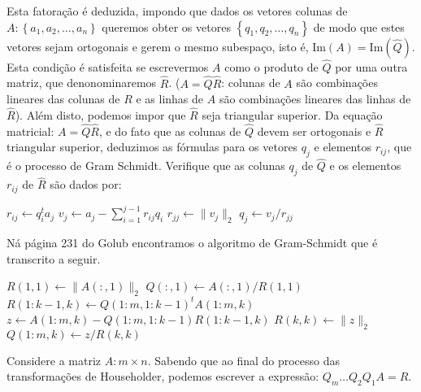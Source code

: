 \documentclass[a4paper,12pt, leqno, answers]{exam}
\begin{document}
\begin{questions}
    Esta fatora\c{c}\~{a}o \'{e} deduzida, impondo que dados os vetores colunas de $A : \left\{ a_1, a_2, \ldots, a_n \right\}$ queremos obter os vetores $\left\{ q_1, q_2, \ldots, q_n \right\}$ de modo que estes vetores sejam ortogonais e gerem o mesmo subespa\c{c}o, isto \'{e}, $\text{Im}(A) = \text{Im}(\hat{Q})$. Esta condi\c{c}\~{a}o \'{e} satisfeita se escrevermos $A$ como o produto de $\hat{Q}$ por uma outra matriz, que denonominaremos $\hat{R}$. ($A = \hat{Q} \hat{R}$: colunas de $A$ s\~{a}o combina\c{c}\~{o}es lineares das colunas de $R$ e as linhas de $A$ s\~{a}o combina\c{c}\~{o}es lineares das linhas de $\hat{R}$). Al\'{e}m disto, podemos impor que $\hat{R}$ seja triangular superior. Da equa\c{c}\~{a}o matricial: $A = \hat{Q} \hat{R}$, e do fato que as colunas de $\hat{Q}$ devem ser ortogonais e $\hat{R}$ triangular superior, deduzimos as f\'{o}rmulas para os vetores $q_j$ e elementos $r_{ij}$, que \'{e} o processo de Gram Schmidt. Verifique que as colunas $q_j$ de $\hat{Q}$ e os elementos $r_{ij}$ de $\hat{R}$ s\~{a}o dados por:
    \begin{algorithmic}
                \State $r_{ij} \leftarrow q_i^t a_j$
            \EndFor
            \State $v_j \leftarrow a_j - \sum_{i = 1}^{j - 1} r_{ij} q_i$
            \State $r_{jj} \leftarrow \| v_j \|_2$
            \State $q_j \leftarrow v_j / r_{jj}$
        \EndFor
    \end{algorithmic}
    \begin{solution}
        N\'{a} p\'{a}gina 231 do Golub\nocite{Golub:1996:matrix} encontramos o algoritmo de Gram-Schmidt que \'{e} transcrito a seguir.
    \begin{algorithmic}
        \State $R(1, 1) \leftarrow \| A(:, 1) \|_2$
        \State $Q(:, 1) \leftarrow A(:, 1) / R(1, 1)$
            \State $R(1:k - 1, k) \leftarrow Q(1:m, 1:k - 1)^t A(1:m, k)$
            \State $z \leftarrow A(1:m, k) - Q(1:m, 1:k - 1) R(1:k - 1, k)$
            \State $R(k, k) \leftarrow \| z \|_2$
            \State $Q(1:m, k) \leftarrow z / R(k, k)$
        \EndFor
    \end{algorithmic}
    \end{solution}

    \question Considere a matriz $A: m \times n$. Sabendo que ao final do processo das transforma\c{c}\~{o}es de Householder, podemos escrever a express\~{a}o: $Q_m \ldots Q_2 Q_1 A = R$.
    \begin{parts}

\end{parts}
\end{questions}
\end{document}
